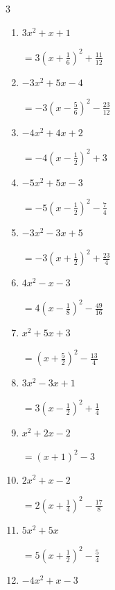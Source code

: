 \begin{multicols}{3}
\begin{enumerate}
\columnbreak %

\resetques

  \item $3x^{2}+x+1$

        $\displaystyle =3\left( x+\frac{1}{6}\right)^{2}+\frac{11}{12}$

  \item $-3x^{2}+5x-4$

        $\displaystyle =-3\left( x-\frac{5}{6}\right)^{2}-\frac{23}{12}$

  \item $-4x^{2}+4x+2$

        $\displaystyle =-4\left( x-\frac{1}{2}\right)^{2}+3$

  \item $-5x^{2}+5x-3$

        $\displaystyle =-5\left( x-\frac{1}{2}\right)^{2}-\frac{7}{4}$

  \item $-3x^{2}-3x+5$

        $\displaystyle =-3\left( x+\frac{1}{2}\right)^{2}+\frac{23}{4}$

\columnbreak %

  \item $4x^{2}-x-3$

        $\displaystyle =4\left( x-\frac{1}{8}\right)^{2}-\frac{49}{16}$

  \item $x^{2}+5x+3$

        $\displaystyle =\left( x+\frac{5}{2}\right)^{2}-\frac{13}{4}$

  \item $3x^{2}-3x+1$

        $\displaystyle =3\left( x-\frac{1}{2}\right)^{2}+\frac{1}{4}$

  \item $x^{2}+2x-2$

        $\displaystyle =\left( x+1\right)^{2}-3$

  \item $2x^{2}+x-2$

        $\displaystyle =2\left( x+\frac{1}{4}\right)^{2}-\frac{17}{8}$

\columnbreak %

  \item $5x^{2}+5x$

        $\displaystyle =5\left( x+\frac{1}{2}\right)^{2}-\frac{5}{4}$

  \item $-4x^{2}+x-3$


\end{enumerate}
\end{multicols}
